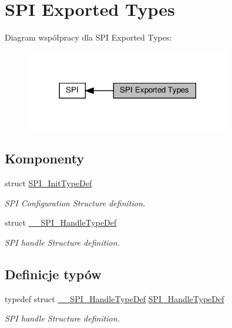 \hypertarget{group___s_p_i___exported___types}{}\section{S\+PI Exported Types}
\label{group___s_p_i___exported___types}
Diagram współpracy dla S\+PI Exported Types\+:\nopagebreak
\begin{figure}[H]
\begin{center}
\leavevmode
\includegraphics[width=254pt]{group___s_p_i___exported___types}
\end{center}
\end{figure}
\subsection*{Komponenty}
\begin{DoxyCompactItemize}
\item 
struct \hyperlink{struct_s_p_i___init_type_def}{S\+P\+I\+\_\+\+Init\+Type\+Def}
\begin{DoxyCompactList}\small\item\em S\+PI Configuration Structure definition. \end{DoxyCompactList}\item 
struct \hyperlink{struct_____s_p_i___handle_type_def}{\+\_\+\+\_\+\+S\+P\+I\+\_\+\+Handle\+Type\+Def}
\begin{DoxyCompactList}\small\item\em S\+PI handle Structure definition. \end{DoxyCompactList}\end{DoxyCompactItemize}
\subsection*{Definicje typów}
\begin{DoxyCompactItemize}
\item 
typedef struct \hyperlink{struct_____s_p_i___handle_type_def}{\+\_\+\+\_\+\+S\+P\+I\+\_\+\+Handle\+Type\+Def} \hyperlink{group___s_p_i___exported___types_gab3bd115785297692c125528b7293566b}{S\+P\+I\+\_\+\+Handle\+Type\+Def}
\begin{DoxyCompactList}\small\item\em S\+PI handle Structure definition. \end{DoxyCompactList}\end{DoxyCompactItemize}
